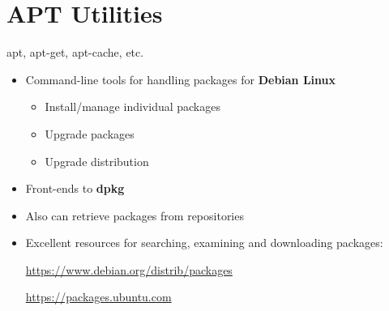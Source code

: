 \section{APT Utilities}
\begin{frame}
   {apt, apt-get, apt-cache, etc.}

   \begin{itemize}
      \item Command-line tools for handling packages for
      \textbf{Debian Linux}
      \begin{itemize}
         \item Install/manage individual packages
         \item Upgrade packages
         \item Upgrade distribution
      \end{itemize}
      \item Front-ends to \textbf{dpkg}
      \item Also can retrieve packages from repositories
      \item Excellent resources for searching, examining and
      downloading packages:

      \url{https://www.debian.org/distrib/packages}

      \url{https://packages.ubuntu.com}

   \end{itemize}

\end{frame}

\cprotect{}

